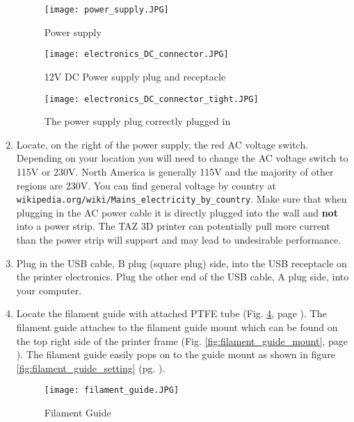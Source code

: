 \begin{enumerate}
\begin{figure}[H]
\centering
\texttt{[image: power\_supply.JPG]}
\caption{Power supply}
\label{fig:power_supply}
\end{figure}

\begin{figure}[H]
\centering
\texttt{[image: electronics\_DC\_connector.JPG]}
\caption{12V DC Power supply plug and receptacle}
\label{fig:ps_plug}
\end{figure}

\begin{figure}[H]
\centering
\texttt{[image: electronics\_DC\_connector\_tight.JPG]}
\caption{The power supply plug correctly plugged in}
\label{fig:electronics_plugs_plugged-in}
\end{figure}

\item Locate, on the right of the power supply, the red AC voltage switch. Depending on your location you will need to change the AC voltage switch to 115V or 230V. North America is generally 115V and the majority of other regions are 230V. You can find general voltage by country at \texttt{wikipedia.org/wiki/Mains\_electricity\_by\_country}. Make sure that when plugging in the AC power cable it is directly plugged into the wall and \textbf{not} into a power strip. The TAZ 3D printer can potentially pull more current than the power strip will support and may lead to undesirable performance. 

\item Plug in the USB cable, B plug (square plug) side, into the USB receptacle on the printer electronics. Plug the other end of the USB cable, A plug side, into your computer.

\item Locate the filament guide with attached PTFE tube
(Fig. \ref{fig:filament_guide}, page \pageref{fig:filament_guide}). The filament guide attaches to the filament guide mount which can be found on the top right side of the printer frame (Fig. \ref{fig:filament_guide_mount}, page \pageref{fig:filament_guide_mount}). The filament guide easily pops on to the guide mount as shown in figure \ref{fig:filament_guide_setting} (pg. \pageref{fig:filament_guide_setting}).
\begin{figure}[H]
\centering
\texttt{[image: filament\_guide.JPG]}
\caption{Filament Guide}
\label{fig:filament_guide}
\end{figure}


\end{enumerate}
